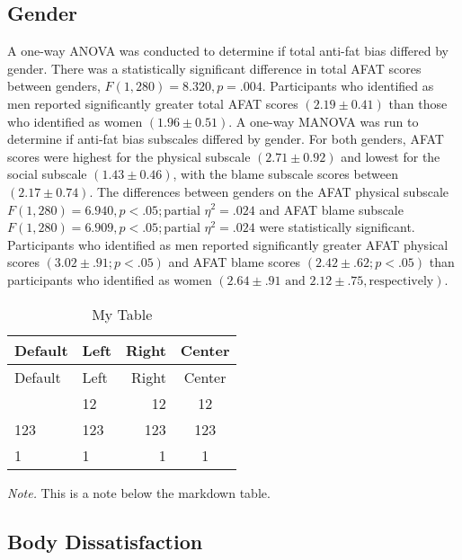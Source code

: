 \documentclass[
  jou,
  longtable,
  nolmodern,
  notxfonts,
  notimes,
  colorlinks=true,linkcolor=blue,citecolor=blue,urlcolor=blue]{apa7}
\begin{document}
\subsection{Gender}\label{gender}

A one-way ANOVA was conducted to determine if total anti-fat bias
differed by gender. There was a statistically significant difference in
total AFAT scores between genders, \(F(1, 280) = 8.320, p = .004\).
Participants who identified as men reported significantly greater total
AFAT scores \((2.19 \pm 0.41)\) than those who identified as women
\((1.96 \pm 0.51)\). A one-way MANOVA was run to determine if anti-fat
bias subscales differed by gender. For both genders, AFAT scores were
highest for the physical subscale \((2.71 \pm 0.92)\) and lowest for the
social subscale \((1.43 \pm 0.46)\), with the blame subscale scores
between \((2.17 \pm 0.74)\). The differences between genders on the AFAT
physical subscale
\(F(1,280) = 6.940, p < .05; \text{partial } \eta^2 = .024\) and AFAT
blame subscale
\(F(1,280) = 6.909, p < .05; \text{partial } \eta^2 = .024\) were
statistically significant. Participants who identified as men reported
significantly greater AFAT physical scores \((3.02 \pm .91; p<.05)\) and
AFAT blame scores \((2.42 \pm .62; p<.05)\) than participants who
identified as women
\((2.64 \pm .91 \text{ and } 2.12 \pm .75, \text{respectively})\).

\begin{ThreePartTable}

\begin{longtable}[]{@{}llrc@{}}
\caption{My Table}\label{tbl-mytable2}\tabularnewline
\toprule\noalign{}
Default & Left & Right & Center \\
\midrule\noalign{}
\endfirsthead
\toprule\noalign{}
Default & Left & Right & Center \\
\midrule\noalign{}
\endhead
\bottomrule\noalign{}
\endlastfoot
12 & 12 & 12 & 12 \\
123 & 123 & 123 & 123 \\
1 & 1 & 1 & 1 \\
\end{longtable}

{\noindent \emph{Note.} This is a note below the markdown table.}

\end{ThreePartTable}

\subsection{Body Dissatisfaction}\label{body-dissatisfaction}
\end{document}
